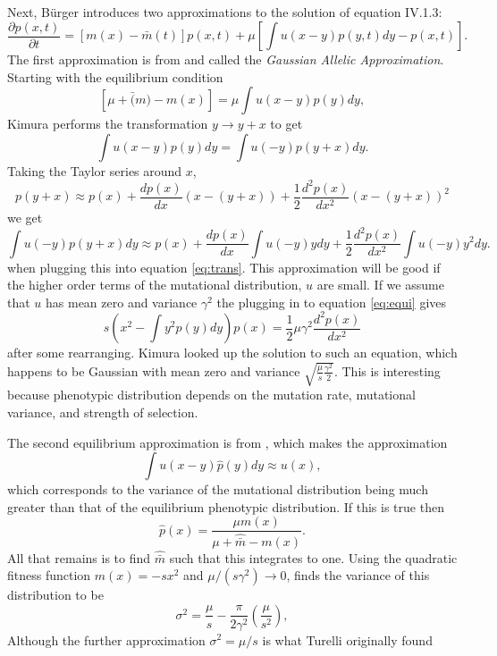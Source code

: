 Next, B{\"u}rger introduces two approximations to the solution of equation IV.1.3:
\begin{equation} \label{eq:1.3}
\frac{\partial p(x,t)}{\partial t} = \left[ m(x) - \bar{m}(t) \right]p(x,t) + \mu \left[ \int u(x-y)p(y,t)dy -p(x,t)\right].
\end{equation}
The first approximation is from \citet{Kimura1965} and called the \emph{Gaussian Allelic Approximation}. Starting with
the equilibrium condition
\begin{equation} \label{eq:equi}
\left[ \mu + \bar(m) - m(x) \right] = \mu \int u(x-y) p(y)dy, 
\end{equation}
Kimura performs the transformation $y \to y + x$ to get
\begin{equation} \label{eq:trans}
\int u(x-y) p(y) dy = \int u(-y)p(y+x)dy.
\end{equation}
Taking the Taylor series around $x$, 
\begin{equation}
p(y+x) \approx p(x) + \frac{dp(x)}{dx}\left( x-(y+x) \right) + \frac{1}{2} \frac{d^2p(x)}{dx^2}\left( x-(y+x) \right)^2
\end{equation}
we get
\begin{equation}
\int u(-y)p(y+x)dy \approx p(x) + \frac{dp(x)}{dx} \int u(-y)y dy + \frac{1}{2} \frac{d^2p(x)}{dx^2}\int u(-y)y^2dy.
\end{equation}
when plugging this into equation \ref{eq:trans}. This approximation will be good if the higher order terms of the
mutational distribution, $u$ are small. If we assume that $u$ has mean zero and variance $\gamma^2$ the plugging in to 
equation \ref{eq:equi} gives
\begin{equation}
s\left( x^2 - \int y^2p(y)dy\right)p(x) = \frac{1}{2}\mu\gamma^2\frac{d^2p(x)}{dx^2}
\end{equation}
after some rearranging. Kimura looked up the solution to such an equation, which happens to be Gaussian with mean zero
and variance $\sqrt{\frac{\mu}{s}\frac{\gamma^2}{2}}$. This is interesting because phenotypic distribution depends on
the mutation rate, mutational variance, and strength of selection.

The second equilibrium approximation is from \citet{Turelli1984}, which makes the approximation 
\begin{equation}
\int u(x-y)\hat{p}(y)dy \approx u(x), 
\end{equation}
which corresponds to the variance of the mutational distribution being much greater than that of the equilibrium
phenotypic distribution. If this is true then 
\begin{equation}
\hat{p}(x) = \frac{\mu m(x)}{\mu + \hat{\bar{m}} - m(x)}.
\end{equation}
All that remains is to find $\hat{\bar{m}}$ such that this integrates to one. Using the quadratic fitness function
$m(x)=-sx^2$ and $\mu/(s\gamma^2) \to 0$, \citet{burger2000mathematical} finds the variance of this distribution to be
\begin{equation}
\sigma^2 = \frac{\mu}{s} - \frac{\pi}{2\gamma^2}\left( \frac{\mu}{s^2}\right), 
\end{equation}
Although the further approximation $\sigma^2=\mu/s$ is what Turelli originally found

